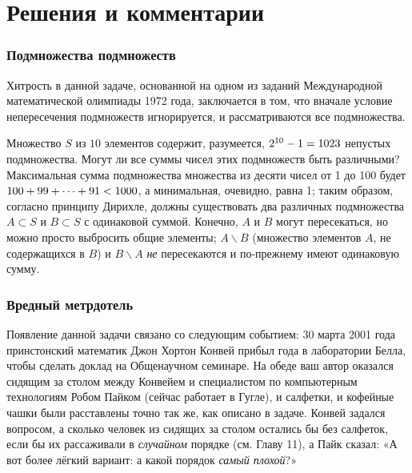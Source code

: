 \section*{Решения и комментарии}

\subsubsection*{Подмножества подмножеств}%

Хитрость в данной задаче, основанной на одном из заданий Международной математической олимпиады 1972 года, заключается в том, что вначале условие непересечения подмножеств игнорируется, и рассматриваются все подмножества.

\medskip

Множество $S$ из $10$ элементов содержит, разумеется, $2^{10} - 1 \z= 1023$ непустых подмножества.
Могут ли все суммы чисел этих подмножеств быть различными?
Максимальная сумма подмножества множества из десяти чисел от 1 до 100 будет 
$100+99+\dots+91\z<1000$, а минимальная, очевидно, равна 1; таким образом, согласно принципу Дирихле, должны существовать два различных подмножества $A\subset S$ и $B\subset S$ 
с одинаковой суммой.
Конечно, $A$ и $B$ могут пересекаться, но можно просто выбросить общие элементы;
$A\backslash B$ (множество элементов $A$, не содержащихся в $B$) и $B\backslash A$ \emph{не} пересекаются и по-прежнему имеют одинаковую сумму.\heart

\subsubsection*{Вредный метрдотель}%

Появление данной задачи связано со следующим событием:
30 марта 2001 года принстонский математик Джон Хортон Конвей %
прибыл года в лаборатории Белла, %
чтобы сделать доклад на Общенаучном семинаре. %
На обеде ваш автор оказался сидящим за столом между Конвейем и специалистом по компьютерным технологиям Робом Пайком %
(сейчас работает в Гугле), и салфетки, и кофейные чашки были расставлены точно так же, как описано в задаче.
Конвей задался вопросом, а сколько человек из
сидящих за столом остались бы без салфеток, если бы их рассаживали в \emph{случайном} порядке (см. Главу 11), а Пайк сказал: «А вот более лёгкий вариант: а какой порядок \emph{самый плохой}?»

\bigskip

